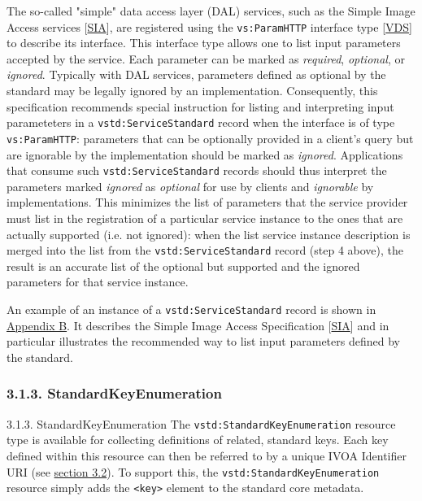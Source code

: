 \documentclass[11pt,a4paper]{ivoa}
\begin{document}
{{The so-called "simple" data access layer (DAL) services, such as the
Simple Image Access services [\href{#r:sia}{SIA}], are
registered using the \texttt{vs:ParamHTTP} interface type
[\href{#r:vds}{VDS}] to describe its interface.  This interface
type allows one to list input parameters accepted by the service.
Each parameter can be marked as \emph{required}, \emph{optional},
or \emph{ignored}.  Typically with DAL services, parameters defined
as optional by the standard may be legally ignored by an
implementation.  Consequently, this specification recommends special
instruction for listing and interpreting input parameteters in a
\texttt{vstd:ServiceStandard} record when the interface is of type
\texttt{vs:ParamHTTP}:  parameters that can be optionally provided
in a client's query but are ignorable by the implementation should be
marked as \emph{ignored}.  Applications that consume such 
\texttt{vstd:ServiceStandard} records should thus interpret the
parameters marked \emph{ignored} as \emph{optional} for use by
clients and \emph{ignorable} by implementations.  This minimizes the
list of parameters that the service provider must list in the
registration of a particular service instance to the ones that are
actually supported (i.e. not ignored): when the list service
instance description is merged into the list from the 
\texttt{vstd:ServiceStandard} record (step 4 above), the result is
an accurate list of the optional but supported and the ignored
parameters for that service instance.



An example of an instance of a \texttt{vstd:ServiceStandard}
record is shown in \href{#appB}{Appendix B}.  It describes the
Simple Image Access Specification [\href{#r:sia}{SIA}] and
in particular illustrates the recommended way to list input parameters
defined by the standard.  



\subsubsection{3.1.3. StandardKeyEnumeration}

\label{}

3.1.3. StandardKeyEnumeration
The \texttt{vstd:StandardKeyEnumeration} resource type is available
for collecting definitions of related, standard keys.  Each key defined
within this resource can then be referred to by a unique IVOA
Identifier URI (see \href{#stdkey}{section 3.2}).  To support
this, the \texttt{vstd:StandardKeyEnumeration} resource simply
adds the \texttt{<key>} element to the standard core
metadata.  



}}
\end{document}
